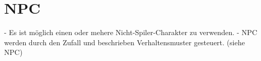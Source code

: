 \section{NPC}
- Es ist möglich einen oder mehere Nicht-Spiler-Charakter zu verwenden.
- NPC werden durch den Zufall und beschrieben Verhaltensmuster gesteuert. (siehe NPC)
